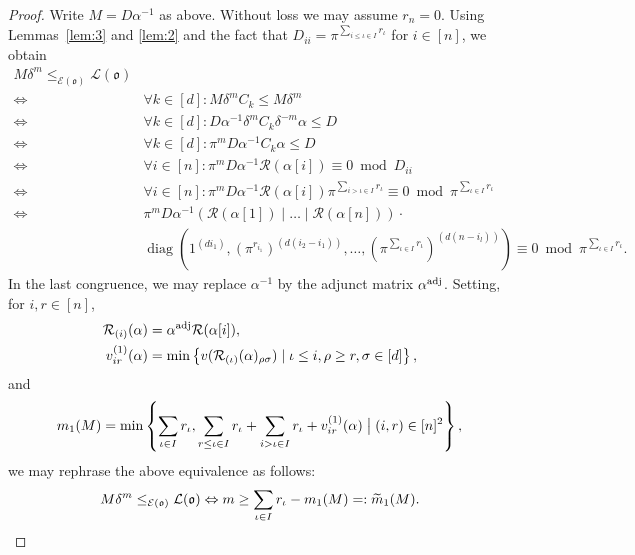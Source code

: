 \documentclass[11pt]{amsart}
\numberwithin{equation}{section}
\numberwithin{figure}{section}
\theoremstyle{plain}
\theoremstyle{definition}
\theoremstyle{remark}
\begin{document}
\begin{proof} Write $M = D \alpha^{-1}$ as above. Without loss we may assume
$r_n=0$. Using Lemmas~\ref{lem:3} and \ref{lem:2} and the fact that
$D_{ii}=\pi^{\sum_{i\leq \iota\in I}r_\iota}$ for $i\in[n]$, we obtain
\begin{align*} M\delta^m \leq_{{\mathcal{E}}({\mathfrak o})} {\ensuremath{\mathcal{L}}}({\mathfrak o})\\
  \Leftrightarrow \;& \forall k\in [d]: M \delta^m C_k \leq M \delta^m\\
  \Leftrightarrow \; & \forall k\in [d]: D \alpha^{-1}\delta^m C_k \delta^{-m}\alpha \leq D \\
 \Leftrightarrow \; & \forall k\in [d] : \pi^m D \alpha^{-1}C_k \alpha \leq D\\
\Leftrightarrow \; & \forall i\in[n]: \pi^mD\alpha^{-1}{\mathcal{R}}(\alpha[i]) \equiv 0 \bmod D_{ii}\\
\Leftrightarrow \; & \forall i\in[n]: \pi^m D \alpha^{-1}{\mathcal{R}}(\alpha[i])\pi^{\sum_{i > \iota \in I} r_\iota} \equiv 0 \bmod \pi^{\sum_{\iota\in I} r_\iota}\\
\Leftrightarrow \; & \pi^m D \alpha^{-1} \left( {\mathcal{R}}(\alpha[1]) \mid \dots \mid {\mathcal{R}}(\alpha[n])\right)\cdot \\
& {\operatorname{diag}(1^{(di_1)},(\pi^{r_{i_1}})^{(d(i_2-i_1))},\dots,(\pi^{\sum_{\iota\in I}r_\iota})^{(d(n-i_l))})\equiv 0 \bmod \pi^{\sum_{\iota\in I}r_\iota}.}
\end{align*}
In the last congruence, we may replace $\alpha^{-1}$ by the adjunct
matrix $\alpha^{\textup{adj}}$.  Setting, for $i,r\in[n]$,
\begin{align*}
{\mathcal{R}}_{(i)}(\alpha) &= \alpha^{\textup{adj}}{\mathcal{R}}(\alpha[i]),\\
v^{(1)}_{ir}(\alpha) &= \min \left\{
v({\mathcal{R}}_{(\iota)}(\alpha)_{\rho\sigma}) \mid \iota \leq i, \rho \geq r,
\sigma\in[d]\right\},
\end{align*}
and
\begin{equation*}
  m_1(M) = \min \left\{ \sum_{\iota\in I}r_\iota, \sum_{r \leq \iota
    \in I} r_\iota + \sum_{i > \iota \in I}r_{\iota} +
  v^{(1)}_{ir}(\alpha) \bigm|  (i,r)\in[n]^2\right\},
\end{equation*}
we may rephrase the above equivalence as follows:
\begin{equation}\label{equ:m1.tilde}
  M\delta^m \leq_{{\mathcal{E}}({\mathfrak o})} {\ensuremath{\mathcal{L}}}({\mathfrak o}) \Leftrightarrow  m \geq \sum_{\iota\in I}r_{\iota} - m_1(M) =: {\ensuremath{\widetilde{m}}}_1(M).\qedhere
\end{equation}
  \end{proof}
\end{document}
